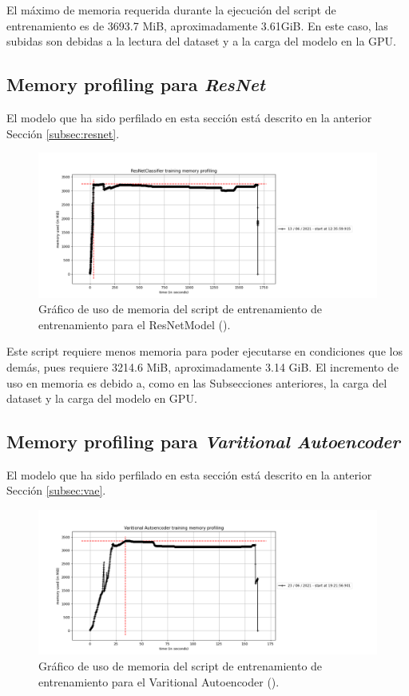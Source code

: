 El máximo de memoria requerida durante la ejecución del script de entrenamiento es de 3693.7 MiB, aproximadamente 3.61GiB. En este caso, las subidas son debidas a la lectura del dataset y a la carga del modelo en la GPU.\\

\subsection{Memory profiling para \textit{ResNet}}

El modelo que ha sido perfilado en esta sección está descrito en la anterior Sección \ref{subsec:resnet}.

\begin{figure}[H]
	\includegraphics[width=1.\linewidth]{imagenes/06_Experimentacion/resnet.png}
	\centering
	\caption{Gráfico de uso de memoria del script de entrenamiento de entrenamiento para el ResNetModel ().}
\end{figure}

Este script requiere menos memoria para poder ejecutarse en condiciones que los demás, pues requiere 3214.6 MiB, aproximadamente 3.14 GiB. El incremento de uso en memoria es debido a, como en las Subsecciones anteriores, la carga del dataset y la carga del modelo en GPU.\\

\subsection{Memory profiling para \textit{Varitional Autoencoder}}

El modelo que ha sido perfilado en esta sección está descrito en la anterior Sección \ref{subsec:vae}.

\begin{figure}[H]
	\includegraphics[width=1.\linewidth]{imagenes/06_Experimentacion/vae.png}
	\centering
	\caption{Gráfico de uso de memoria del script de entrenamiento de entrenamiento para el Varitional Autoencoder ().}
\end{figure}

